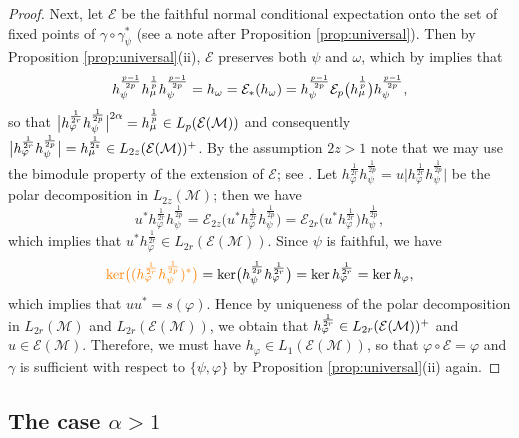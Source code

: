 \documentclass[12pt]{article}
\theoremstyle{definition}
\theoremstyle{remark}
\numberwithin{equation}{section}
\def\cE{\mathcal E}
\def\Me{\mathcal M}
\def\ffi{\varphi}
\begin{document}
\begin{proof}
Next, let $\mathcal E$ be the faithful  normal conditional expectation onto the
set of fixed points of $\gamma\circ\gamma^*_\psi$ (see a note after Proposition \ref{prop:universal}). Then
by Proposition \ref{prop:universal}(ii), $\mathcal E$ preserves both $\psi$ and $\omega$, which by
\cite{junge2003noncommutative} implies that 
\[
h_\psi^{p-1\over 2p}h_\mu^{\frac1p}h_\psi^{p-1\over 2p}=h_\omega=\mathcal
E_*(h_\omega)=h_\psi^{p-1\over 2p}\cE_p\bigl(h_\mu^{\frac1p}\bigr)h_\psi^{p-1\over 2p},
\]
so that $\big|h_\ffi^{1\over 2r}h_\psi^{1\over 2p}\big|^{2\alpha}= h_\mu^{\frac1p}\in
L_p(\cE(\Me))$ and consequently $\big|h_\varphi^{\frac1{2r}}h_\psi^{\frac1{2p}}\big|=h_\mu^{1\over
2z}\in L_{2z}(\mathcal E(\Me))^+$. By the assumption $2z>1$ note that we may use the
{bimodule property} of the extension of $\mathcal E$; {see
\cite[Proposition 2.3(ii)]{junge2003noncommutative}.}
Let  $h_\varphi^{\frac1{2r}}h_\psi^{\frac1{2p}}=u\big|h_\varphi^{\frac1{2r}}h_\psi^{\frac1{2p}}\big|$ be the
polar decomposition in $L_{2z}(\Me)$; then we have 
\[
u^*h_\varphi^{\frac1{2r}}h_\psi^{\frac1{2p}}=\mathcal
E_{2z}\bigl(u^*h_\varphi^{\frac1{2r}}h_\psi^{\frac1{2p}}\bigr)=\mathcal
E_{2r}\bigl(u^*h_\varphi^{\frac1{2r}}\bigr)h_\psi^{\frac1{2p}},
\]
which implies that $u^*h_\varphi^{\frac1{2r}}\in L_{2r}(\cE(\Me))$. Since $\psi$ is
faithful, we have
{
\[
\textcolor{orange}{\ker\bigl((h_\ffi^{1\over2r}h_\psi^{1\over2p})^*\bigr)}=\ker\bigl(h_\psi^{1\over2p}h_\ffi^{1\over2r}\bigr)
=\ker h_\ffi^{1\over2r}=\ker h_\ffi,
\]
which implies that $uu^*=s(\ffi)$.}
Hence by uniqueness of the polar decomposition in $L_{2r}(\Me)$ and $L_{2r}(\cE(\Me))$,
we obtain that $h_\ffi^{1\over 2r}\in L_{2r}(\cE(\Me))^+$ and $u\in \cE(\Me)$. 
Therefore, we must have $h_\ffi\in L_1(\cE(\Me))$, so that $\ffi\circ\mathcal E=\ffi$ and $\gamma$ is
sufficient with respect to $\{\psi,\varphi\}$ by Proposition \ref{prop:universal}(ii) again.
\end{proof}


\subsection{The case $\alpha>1$}
\end{document}
